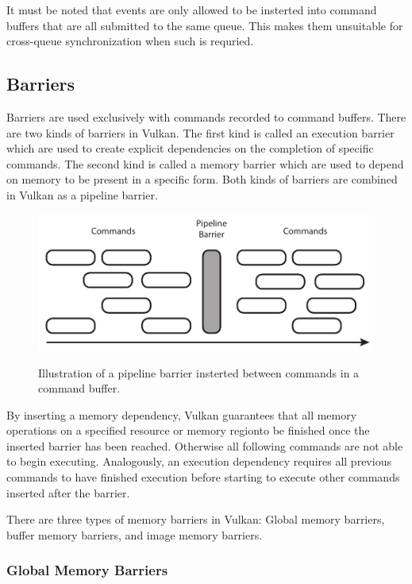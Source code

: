       It must be noted that events are only allowed to be insterted into command buffers that are all submitted to the same queue. This makes them unsuitable for cross-queue synchronization when such is requried.

    \subsection{Barriers}
    \label{sub:Barriers}
      Barriers are used exclusively with commands recorded to command buffers. There are two kinds of barriers in Vulkan. The first kind is called an execution barrier which are used to create explicit dependencies on the completion of specific commands. The second kind is called a memory barrier which are used to depend on memory to be present in a specific form. Both kinds of barriers are combined in Vulkan as a pipeline barrier.

      \begin{figure}
        \caption{Illustration of a pipeline barrier insterted between commands in a command buffer.}
        \centering
        \includegraphics{Main/Images/PipelineBarrier}
        \label{fig:PipelineBarrier}
      \end{figure}

      By inserting a memory dependency, Vulkan guarantees that all memory operations on a specified resource or memory regionto be finished once the inserted barrier has been reached. Otherwise all following commands are not able to begin executing. Analogously, an execution dependency requires all previous commands to have finished execution before starting to execute other commands inserted after the barrier.

      There are three types of memory barriers in Vulkan: Global memory barriers, buffer memory barriers, and image memory barriers.

      \subsubsection{Global Memory Barriers}

